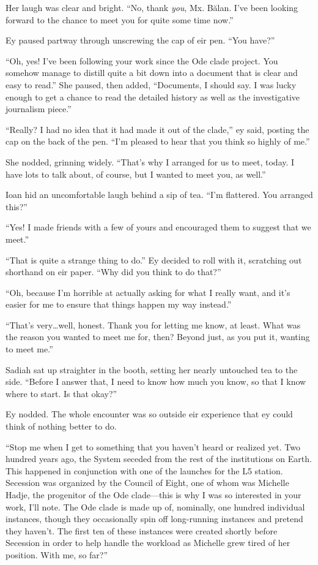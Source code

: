 Her laugh was clear and bright. ``No, thank \emph{you}, Mx. Bălan. I've been looking forward to the chance to meet you for quite some time now.''

Ey paused partway through unscrewing the cap of eir pen. ``You have?''

``Oh, yes! I've been following your work since the Ode clade project. You somehow manage to distill quite a bit down into a document that is clear and easy to read.'' She paused, then added, ``Documents, I should say. I was lucky enough to get a chance to read the detailed history as well as the investigative journalism piece.''

``Really? I had no idea that it had made it out of the clade,'' ey said, posting the cap on the back of the pen. ``I'm pleased to hear that you think so highly of me.''

She nodded, grinning widely. ``That's why I arranged for us to meet, today. I have lots to talk about, of course, but I wanted to meet you, as well.''

Ioan hid an uncomfortable laugh behind a sip of tea. ``I'm flattered. You arranged this?''

``Yes! I made friends with a few of yours and encouraged them to suggest that we meet.''

``That is quite a strange thing to do.'' Ey decided to roll with it, scratching out shorthand on eir paper. ``Why did you think to do that?''

``Oh, because I'm horrible at actually asking for what I really want, and it's easier for me to ensure that things happen my way instead.''

``That's very\ldots well, honest. Thank you for letting me know, at least. What was the reason you wanted to meet me for, then? Beyond just, as you put it, wanting to meet me.''

Sadiah sat up straighter in the booth, setting her nearly untouched tea to the side. ``Before I answer that, I need to know how much you know, so that I know where to start. Is that okay?''

Ey nodded. The whole encounter was so outside eir experience that ey could think of nothing better to do.

``Stop me when I get to something that you haven't heard or realized yet. Two hundred years ago, the System seceded from the rest of the institutions on Earth. This happened in conjunction with one of the launches for the L5 station. Secession was organized by the Council of Eight, one of whom was Michelle Hadje, the progenitor of the Ode clade---this is why I was so interested in your work, I'll note. The Ode clade is made up of, nominally, one hundred individual instances, though they occasionally spin off long-running instances and pretend they haven't. The first ten of these instances were created shortly before Secession in order to help handle the workload as Michelle grew tired of her position. With me, so far?''

